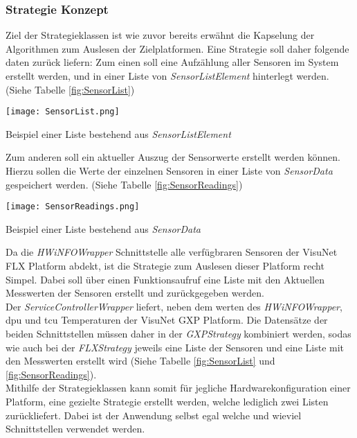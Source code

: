 \subsubsection*{Strategie Konzept}
Ziel der Strategieklassen ist wie zuvor bereits erwähnt die Kapselung der Algorithmen zum Auslesen der Zielplatformen. Eine Strategie soll daher folgende daten zurück liefern: Zum einen soll eine Aufzählung aller Sensoren im System erstellt werden, und in einer Liste von \textit{SensorListElement} hinterlegt werden. (Siehe Tabelle \ref{fig:SensorList}) 
\vspace{-0.5cm}
\begin{center}
    \begin{table}[h!]
        \centering
        \texttt{[image: SensorList.png]}
        \caption{Beispiel einer Liste bestehend aus \textit{SensorListElement}}
        \label{fig:SensorList}
    \end{table}
\end{center}
\vspace{-1.8cm}
Zum anderen soll ein aktueller Auszug der Sensorwerte erstellt werden können. Hierzu sollen die Werte der einzelnen Sensoren in einer Liste von \textit{SensorData} gespeichert werden. (Siehe Tabelle \ref{fig:SensorReadings})
\vspace{-0.5cm}
\begin{center}
    \begin{table}[h!]
        \centering
        \texttt{[image: SensorReadings.png]}
        \caption{Beispiel einer Liste bestehend aus \textit{SensorData}}
        \label{fig:SensorReadings}
    \end{table}
\end{center}
\vspace{-1.8cm}
Da die \textit{HWiNFOWrapper} Schnittstelle alle verfügbraren Sensoren der VisuNet FLX Platform abdekt, ist die Strategie zum Auslesen dieser Platform recht Simpel. Dabei soll über einen Funktionsaufruf eine Liste mit den Aktuellen Messwerten der Sensoren erstellt und zurückgegeben werden.\\
Der \textit{ServiceControllerWrapper} liefert, neben dem werten des \textit{HWiNFOWrapper}, \ac{dpu} und \ac{tcu} Temperaturen der VisuNet GXP Platform. Die Datensätze der beiden Schnittstellen müssen daher in der \textit{GXPStrategy} kombiniert werden, sodas wie auch bei der \textit{FLXStrategy} jeweils eine Liste der Sensoren und eine Liste mit den Messwerten erstellt wird (Siehe Tabelle \ref{fig:SensorList} und \ref{fig:SensorReadings}).\\
Mithilfe der Strategieklassen kann somit für jegliche Hardwarekonfiguration einer Platform, eine gezielte Strategie erstellt werden, welche lediglich zwei Listen zurückliefert. Dabei ist der Anwendung selbst egal welche und wieviel Schnittstellen verwendet werden.

